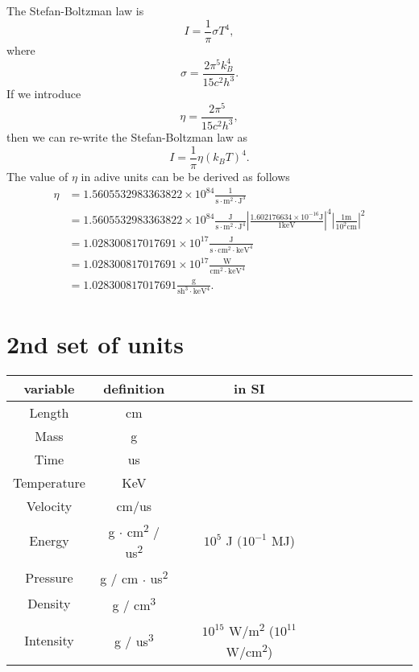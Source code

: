\documentclass[11pt]{article}
\begin{document}
The Stefan-Boltzman law is
\begin{equation}
    I = \frac{1}{\pi} \sigma T^4,
\end{equation} 
where 
\begin{equation}
    \sigma = \frac{2 \pi^5 k_B^4 }{15 c^2 h^3}.
\end{equation}
If we introduce 
\begin{equation}
    \eta = \frac{2 \pi^5 }{15 c^2 h^3},
\end{equation}
then we can re-write the Stefan-Boltzman law as
\begin{equation}
    I = \frac{1}{\pi} \eta (k_B T)^4.
\end{equation}
The value of $\eta$ in adive units can be be derived as follows
\begin{align}
    \eta &= 1.5605532983363822 \times 10^{84} \frac{1}{\text{s} \cdot \text{m}^2 \cdot \text{J}^3} \nonumber \\
    &= 1.5605532983363822 \times 10^{84} \frac{\text{J}}{\text{s} \cdot \text{m}^2 \cdot \text{J}^4} \left | \frac{1.602176634 \times 10^{-16} \text{J}}{1\text{keV}} \right |^4 \left | \frac{1\text{m}}{10^2 \text{cm}} \right |^2 \nonumber \\
    &= 1.028300817017691 \times 10^{17} \frac{\text{J}}{\text{s} \cdot \text{cm}^2 \cdot \text{keV}^4} \nonumber \\
    &= 1.028300817017691 \times 10^{17} \frac{\text{W}}{\text{cm}^2 \cdot \text{keV}^4} \nonumber \\
    &= 1.028300817017691 \frac{\text{g}}{\text{sh}^3 \cdot \text{keV}^4}.
\end{align}

\section{2nd set of units}

\begin{center}
    \begin{tabular}{|Sc|Sc|Sc|Sc|Sc|}
        \hline
        variable & definition & in SI \\
        \hline 
        Length & cm & \\
        \hline
        Mass & g & \\
        \hline
        Time & us & \\
        \hline
        Temperature & KeV & \\
        \hline
        Velocity & cm/us & \\
        \hline
        Energy & g \( \cdot \) cm\textsuperscript{2} / us\textsuperscript{2} & $10^5$ J  $(10^{-1}$ MJ)\\
        \hline 
        Pressure & g / cm \( \cdot \) us\textsuperscript{2} & \\
        \hline
        Density & g / cm\textsuperscript{3} & \\
        \hline 
        Intensity & g / us\textsuperscript{3} & $10^{15}$ W/m\textsuperscript{2} ($10^{11}$ W/cm\textsuperscript{2})\\
        \hline
    \end{tabular}
\end{center}
\end{document}
